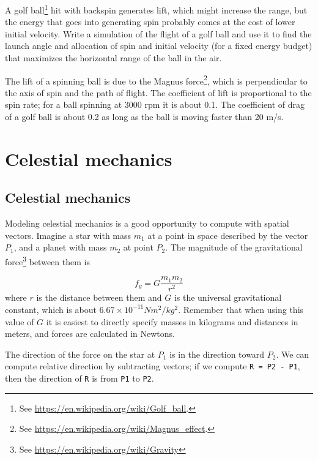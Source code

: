 \documentclass{book}
\begin{document}
\begin{ex}
\label{golf}

A golf ball\footnote{See
\url{https://en.wikipedia.org/wiki/Golf_ball}.} hit with backspin
generates lift, which might increase the range, but the energy that
goes into generating spin probably comes at the cost of lower initial
velocity.  Write a simulation of the flight of a golf ball and use it
to find the launch angle and allocation of spin and initial velocity
(for a fixed energy budget) that maximizes the horizontal range of the
ball in the air.

The lift of a spinning ball is due to the Magnus force\footnote{See
\url{https://en.wikipedia.org/wiki/Magnus_effect}.}, which is
perpendicular to the axis of spin and the path of flight.  The
coefficient of lift is proportional to the spin rate; for a ball
spinning at 3000 rpm it is about 0.1.  The coefficient of drag of a
golf ball is about 0.2 as long as the ball is moving faster than 20 m/s.
\end{ex}



\chapter{Celestial mechanics}

\section{Celestial mechanics}

Modeling celestial mechanics is a good opportunity
to compute with spatial vectors.
Imagine a star with mass $m_1$ at a point in space described by the
vector $P_1$, and a planet with mass $m_2$ at point $P_2$.  The
magnitude of the gravitational force\footnote{See
\url{https://en.wikipedia.org/wiki/Gravity}} between them is

\[ f_g = G \frac{m_1 m_2}{r^2}  \]
%
where $r$ is the distance between them and $G$ is the universal
gravitational constant, which is about $6.67 \times 10^{-11} N m^2 /
kg^2$.  Remember that when using this 
value of $G$ it is easiest to directly specify 
masses 
in kilograms and distances in meters, and forces are calculated in Newtons.

The direction of the force on the star at $P_1$ is in the
direction toward $P_2$.  We can compute relative direction by
subtracting vectors; if we compute {\tt R = P2 - P1}, then
the direction of {\tt R} is from {\tt P1} to {\tt P2}.
\end{document}
